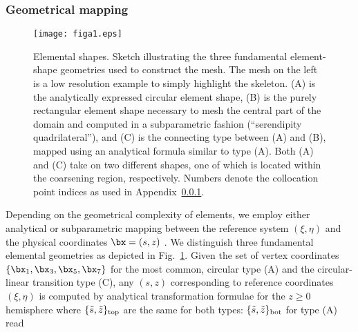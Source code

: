\subsubsection{Geometrical mapping} \label{appsection:geom_mapping}
%
\begin{figure}[htb!]
\begin{center}
\texttt{[image: figa1.eps]}
\caption{Elemental shapes. Sketch illustrating the three fundamental 
element-shape geometries used to construct the mesh. 
The mesh on the left is a low resolution example to simply highlight 
the skeleton. (A) is the analytically expressed circular
element shape, (B) is the purely rectangular 
element shape necessary to mesh the central part of the domain and computed in 
a subparametric fashion (``serendipity quadrilateral''), and (C) is the 
connecting type between (A) and (B), mapped using an analytical formula 
similar to type (A). 
Both (A) and (C) take on two different shapes, one of which is located 
within the coarsening region, respectively.
Numbers denote the collocation point 
indices as used in Appendix~\ref{appsection:geom_mapping}.}
\label{figa1}
\end{center}
\end{figure}
%
%
Depending on the geometrical complexity of elements, we employ either 
analytical or subparametric mapping between the reference system 
$(\xi,\eta)$ and the physical coordinates $\bx=(s,z)$ \citep{fournier04}. 
We distinguish three fundamental elemental geometries as depicted in 
Fig.~\ref{figa1}. Given the set of vertex coordinates 
$\{\bx_1,\bx_3,\bx_5,\bx_7\}$ for the most common, circular type (A) and 
the circular-linear transition type (C), any $(s,z)$ corresponding to 
reference coordinates $(\xi,\eta)$  is computed by analytical transformation 
formulae for the $z\ge 0$ hemisphere
%
\eq \label{appeq:generic_sz_a_c}
\en
%
where $\{\tilde{s},\tilde{z}\}_{\rm top}$ are the same for both types:
%
\eq \label{appeq:sz_top_ac}
\en
%
$\{\tilde{s},\tilde{z}\}_{\rm bot}$ for type (A) read
